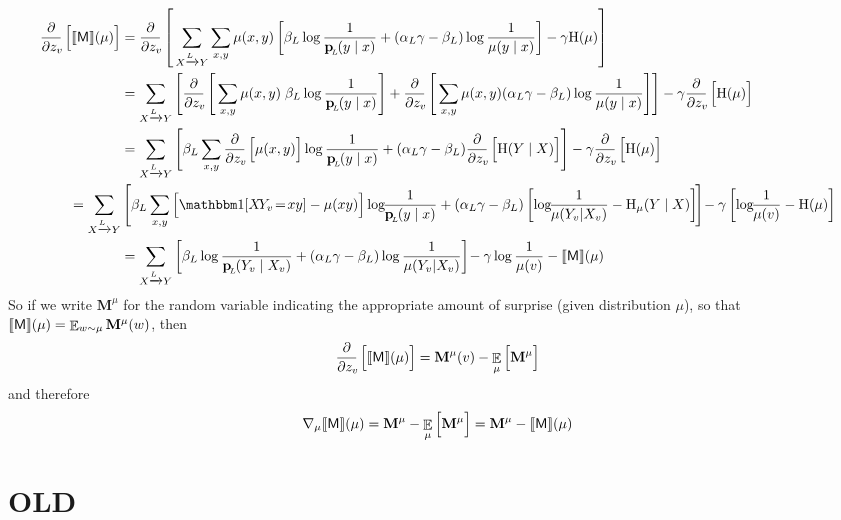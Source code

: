 \documentclass{article}
\newcommand{\sfM}{\mathsf M}
\begin{document}
	\begin{align*}
		\pz{\bbr{\sfM}(\mu)} &= \pz{ \sum_{ X \xrightarrow{\!\!L} Y} \sum_{x,y}\mu(x,y)  \left[
		\beta_L \log \frac{1}{\bp(y\mid x)} + (\alpha_L\gamma - \beta_L) \log \frac{1}{\mu(y \mid x)} \right] - \gamma \H(\mu)} \\
		&= \sum_{ X \xrightarrow{\!\!L} Y} \left[ \pz{  \sum_{x,y}\mu(x,y)\;
		\beta_L \log \frac{1}{\bp(y\mid x)}} +  \pz{\sum_{x,y}\mu(x,y) (\alpha_L\gamma - \beta_L) \log \frac{1}{\mu(y \mid x)} } \right] - \gamma \pz{\H(\mu)} \\
		&= \sum_{ X \xrightarrow{\!\!L} Y}  \left[   \beta_L\sum_{x,y}\pz{\mu(x,y)}  \log \frac{1}{\bp(y\mid x)} +  (\alpha_L\gamma - \beta_L) \pz{\H(Y\mid X) } \right] - \gamma \pz{\H(\mu)} \\
		= \sum_{ X \xrightarrow{\!\!L} Y} & \left[  \beta_L\sum_{x,y} \Big[\mathbbm1[X\!Y_v \!=\! xy] - \mu(xy)\Big]  \log \!\!\frac{1}{\bp(y\mid x)} +  (\alpha_L\gamma - \beta_L) \left[ \log\!\! \frac{1}{\mu(Y_v | X_v)} - \H_\mu(Y \mid X)\right] \! \right] \!- \gamma\left[\log\!\!\frac{1}{\mu(v)}- \H(\mu)\right] \\
		 &= \sum_{ X \xrightarrow{\!\!L} Y}\left[  \beta_L \log \frac{1}{\bp(Y_v \mid X_v)} +  (\alpha_L\gamma - \beta_L) \log \frac{1}{\mu(Y_v | X_v)} \right] \!- \gamma\log\frac{1}{\mu(v)} - \bbr{\sfM}(\mu) \\
	\end{align*}
	\def\MM{\mathbf{M}}
	So if we write $\MM^\mu$ for the random variable indicating the appropriate amount of surprise (given distribution $\mu$), so that $\bbr{\sfM}(\mu) = \E_{w \sim \mu} \MM^\mu(w)$, then 
	\[ \pz{\bbr{\sfM}(\mu)} = \MM^\mu(v) - \E_{\mu}\Big[ \MM^\mu \Big] \]
	and therefore
	\[ \nabla_\mu{\bbr{\sfM}(\mu)} = \MM^\mu - \E_{\mu}\Big[ \MM^\mu \Big]
		= \MM^\mu - \bbr{\sf M}(\mu) \]
	
	\clearpage
	\section*{OLD}
	
\end{document}
